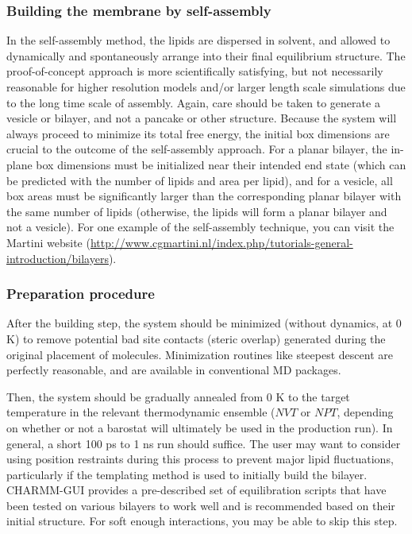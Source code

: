 \documentclass[9pt,bestpractices]{livecoms}
\begin{document}
\subsubsection{Building the membrane by self-assembly}
\label{subsubsec:selfassembly}
In the self-assembly method, the lipids are dispersed in solvent, and allowed to dynamically and spontaneously arrange into their final equilibrium structure.
The proof-of-concept approach is more scientifically satisfying, but not necessarily reasonable for higher resolution models and/or larger length scale simulations due to the long time scale of assembly.
Again, care should be taken to generate a vesicle or bilayer, and not a pancake or other structure.
Because the system will always proceed to minimize its total free energy, the initial box dimensions are crucial to the outcome of the self-assembly approach.
For a planar bilayer, the in-plane box dimensions must be initialized near their intended end state (which can be predicted with the number of lipids and area per lipid), and for a vesicle, all box areas must be significantly larger than the corresponding planar bilayer with the same number of lipids (otherwise, the lipids will form a planar bilayer and not a vesicle).
For one example of the self-assembly technique, you can visit the Martini website (\url{http://www.cgmartini.nl/index.php/tutorials-general-introduction/bilayers}).


\subsubsection{Preparation procedure}
\label{subsubsec:prepproc}
After the building step, the system should be minimized (without dynamics, at 0 K) to remove potential bad site contacts (steric overlap) generated during the original placement of molecules.
Minimization routines like steepest descent are perfectly reasonable, and are available in conventional MD packages.

Then, the system should be gradually annealed from 0 K to the target temperature in the relevant thermodynamic ensemble ($NVT$ or $NPT$, depending on whether or not a barostat will ultimately be used in the production run).
In general, a short 100 ps to 1 ns run should suffice.
The user may want to consider using position restraints during this process to prevent major lipid fluctuations, particularly if the templating method is used to initially build the bilayer. CHARMM-GUI provides a pre-described set of equilibration scripts that have been tested on various bilayers to work well and is recommended based on their initial structure.
For soft enough interactions, you may be able to skip this step.
\end{document}
